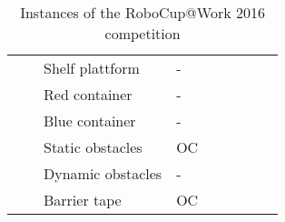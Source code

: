 \begin{table}[h!]
\begin{tabular}{l|l|l|l*{5}{|P{1cm}}|}
      &  & Shelf plattform       & -        &            &           &          &           &         \\
      &  & Red container         & -        &            &           &          &           &         \\
      &  & Blue container        & -        &            &           &          &           &         \\
    \hline
     & 
     &      Static obstacles     & OC      &            &           &          &           &         \\
     &   &  Dynamic obstacles    & -       &            &           &          &           &         \\
     &   &  Barrier tape         & OC      &            &           &          &           &         \\
     \hline
 \end{tabular}
 \label{tab:Instances}
 \caption{Instances of the RoboCup@Work 2016 competition}
\end{table}
